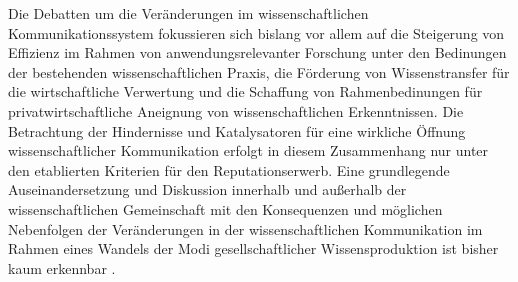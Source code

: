 Die Debatten um die Veränderungen im wissenschaftlichen Kommunikationssystem fokussieren sich bislang vor allem auf die Steigerung von Effizienz im Rahmen von anwendungsrelevanter Forschung unter den Bedinungen der bestehenden wissenschaftlichen Praxis, die Förderung von Wissenstransfer für die wirtschaftliche Verwertung und die Schaffung von Rahmenbedinungen für privatwirtschaftliche Aneignung von wissenschaftlichen Erkenntnissen. Die Betrachtung der Hindernisse und Katalysatoren für eine wirkliche Öffnung wissenschaftlicher Kommunikation erfolgt in diesem Zusammenhang nur unter den etablierten Kriterien für den Reputationserwerb. Eine grundlegende Auseinandersetzung und Diskussion innerhalb und außerhalb der wissenschaftlichen Gemeinschaft mit den Konsequenzen und möglichen Nebenfolgen der Veränderungen in der wissenschaftlichen Kommunikation im Rahmen eines Wandels der Modi gesellschaftlicher Wissensproduktion ist bisher kaum erkennbar \cite{Buss_2001}.
